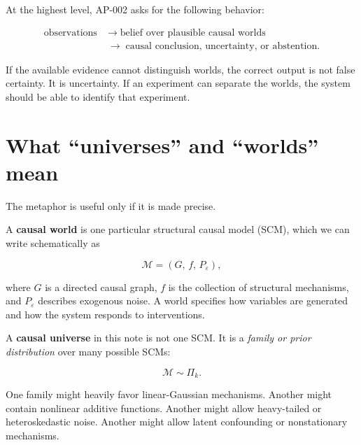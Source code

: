 \documentclass[11pt]{article}
\begin{document}
At the highest level, AP-002 asks for the following behavior:

\begin{equation}
\begin{aligned}
\text{observations}
&\;\longrightarrow\;
\text{belief over plausible causal worlds}\\
&\;\longrightarrow\;
\text{causal conclusion, uncertainty, or abstention}.
\end{aligned}
\end{equation}

If the available evidence cannot distinguish worlds, the correct output is not false certainty. It is uncertainty. If an experiment can separate the worlds, the system should be able to identify that experiment.

\section{What ``universes'' and ``worlds'' mean}

The metaphor is useful only if it is made precise.

A \textbf{causal world} is one particular structural causal model (SCM), which we can write schematically as

\begin{equation}
\mathcal{M}=(G,\,f,\,P_{\varepsilon}),
\end{equation}

where $G$ is a directed causal graph, $f$ is the collection of structural mechanisms, and $P_{\varepsilon}$ describes exogenous noise. A world specifies how variables are generated and how the system responds to interventions.

A \textbf{causal universe} in this note is not one SCM. It is a \emph{family or prior distribution} over many possible SCMs:

\begin{equation}
\mathcal{M}\sim\Pi_k.
\end{equation}

One family might heavily favor linear-Gaussian mechanisms. Another might contain nonlinear additive functions. Another might allow heavy-tailed or heteroskedastic noise. Another might allow latent confounding or nonstationary mechanisms.
\end{document}
